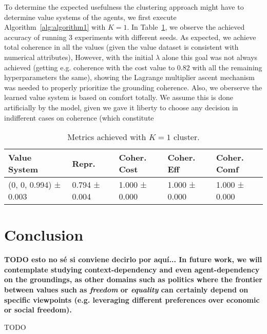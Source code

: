 \documentclass{ecai}
\begin{document}
To determine the expected usefulness the clustering approach might have to determine value systems of the agents, we first execute Algorithm~\ref{alg:algorithm1} with $K=1$. In Table~\ref{tab:tablek1}, we observe the achieved accuracy of running $3$ experiments with different seeds. As expected, we achieve total coherence in all the values (given the value dataset is consistent with numerical attributes), However, with the initial $\lambda$ alone this goal was not always achieved (getting e.g. coherence with the cost value to $0.82$ with all the remaining hyperparameters the same), showing the Lagrange multiplier ascent mechanism was needed to properly prioritize the grounding coherence. Also, we oberserve the learned value system is based on comfort totally. We assume this is done artificially by the model, given we gave it liberty to choose any decision in indifferent cases on coherence (which constitute 

\begin{table}[h]
    \centering
    \begin{tabular}{p{1.6cm}p{0.9cm}p{0.9cm}p{0.9cm}p{0.9cm}}
        \toprule
        Value System & Repr. & Coher. Cost & Coher. Eff & Coher. Comf \\
        \midrule
        (0, 0, 0.994) ± 0.003 & 0.794 ± 0.004 & 1.000 ± 0.000 & 1.000 ± 0.000 & 1.000 ± 0.000 \\
        \bottomrule
        \end{tabular}
    \caption{Metrics achieved with $K=1$ cluster.}
    \label{tab:tablek1}
\end{table}



\section{Conclusion}


\textbf{TODO esto no sé si conviene decirlo por aquí... In future work, we will contemplate studying context-dependency and even agent-dependency on the groundings, as other domains such as politics where the frontier between values such as \textit{freedom} or \textit{equality} can certainly depend on specific viewpoints (e.g. leveraging different preferences over economic or social freedom).} 


\begin{ack}
TODO
\end{ack}




\end{document}
